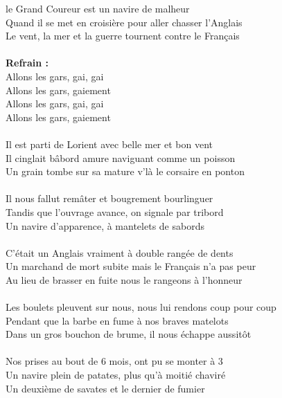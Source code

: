 
 le Grand Coureur est un navire de malheur
\\Quand il se met en croisière pour aller chasser l'Anglais
\\Le vent, la mer et la guerre tournent contre le Français
\\\\\textbf{Refrain :}
\\Allons les gars, gai, gai
\\Allons les gars, gaiement
\\Allons les gars, gai, gai
\\Allons les gars, gaiement
\\\\Il est parti de Lorient avec belle mer et bon vent
\\Il cinglait bâbord amure naviguant comme un poisson
\\Un grain tombe sur sa mature v'là le corsaire en ponton
\\\\Il nous fallut remâter et bougrement bourlinguer
\\Tandis que l'ouvrage avance, on signale par tribord
\\Un navire d'apparence, à mantelets de sabords
\\\\C'était un Anglais vraiment à double rangée de dents
\\Un marchand de mort subite mais le Français n'a pas peur
\\Au lieu de brasser en fuite nous le rangeons à l'honneur
\\\\Les boulets pleuvent sur nous, nous lui rendons coup pour coup
\\Pendant que la barbe en fume à nos braves matelots
\\Dans un gros bouchon de brume, il nous échappe aussitôt
\\\\Nos prises au bout de 6 mois, ont pu se monter à 3
\\Un navire plein de patates, plus qu'à moitié chaviré
\\Un deuxième de savates et le dernier de fumier
